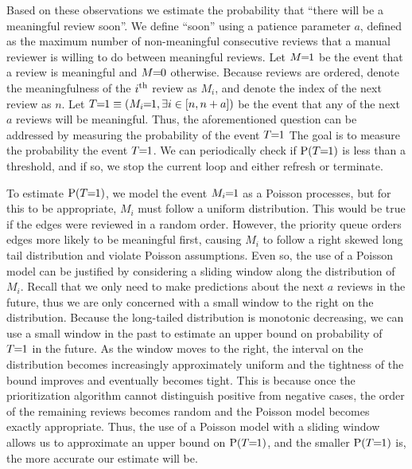 
Based on these observations we estimate the probability that ``there will be a meaningful review soon''. We define
``soon'' using a patience parameter $a$, defined as the maximum number of non-meaningful consecutive reviews that a
manual reviewer is willing to do between meaningful reviews. Let $M\mkern-6mu=\mkern-6mu1$ be the event that a review is meaningful
and $M\mkern-6mu=\mkern-6mu0$ otherwise. Because reviews are ordered, denote the meaningfulness of the $i^{\textrm{th}}$ review as $M_i$, and
denote the index of the next review as $n$. Let $T\mkern-6mu=\mkern-6mu1 \equiv (M_i\mkern-6mu=\mkern-6mu1, \exists i \in [n, n + a])$ be the event
that any of the next $a$ reviews will be meaningful. Thus, the aforementioned question can be addressed by
measuring the probability of the event $T\mkern-6mu=\mkern-6mu1$ The goal is to measure the probability the event $T\mkern-6mu=\mkern-6mu1$. We can
periodically check if $\mathbin{\operatorname{P}}(T\mkern-6mu=\mkern-6mu1)$ is less than a threshold, and if so, we stop the current loop and either
refresh or terminate.

To estimate $\mathbin{\operatorname{P}}(T\mkern-6mu=\mkern-6mu1)$, we model the event $M_i\mkern-6mu=\mkern-6mu1$ as a Poisson processes, but for this to be appropriate,
  $M_i$ must follow a uniform distribution.
This would be true if the edges were reviewed in a random order.
However, the priority queue orders edges more likely to be meaningful first, causing $M_i$ to follow a right
  skewed long tail distribution and violate Poisson assumptions.
Even so, the use of a Poisson model can be justified by considering a sliding window along the distribution of
  $M_i$.
Recall that we only need to make predictions about the next $a$ reviews in the future, thus we are only concerned
  with a small window to the right on the distribution.
Because the long-tailed distribution is monotonic decreasing, we can use a small window in the past to estimate
  an upper bound on probability of $T\mkern-6mu=\mkern-6mu1$ in the future.
As the window moves to the right, the interval on the distribution becomes increasingly approximately uniform and
  the tightness of the bound improves and eventually becomes tight.
This is because once the prioritization algorithm cannot distinguish positive from negative cases, the order of
  the remaining reviews becomes random and the Poisson model becomes exactly appropriate.
Thus, the use of a Poisson model with a sliding window allows us to approximate an upper bound on $\mathbin{\operatorname{P}}(T\mkern-6mu=\mkern-6mu1)$,
  and the smaller $\mathbin{\operatorname{P}}(T\mkern-6mu=\mkern-6mu1)$ is, the more accurate our estimate will be.


